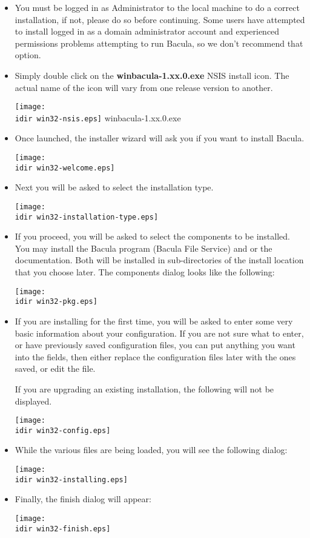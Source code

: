\begin{itemize}
\item You must be logged in as Administrator to the local machine
to do a correct installation, if not, please do so before continuing.
Some users have attempted to install logged in as a domain administrator
account and experienced permissions problems attempting to run
Bacula, so we don't recommend that option.
  
\item Simply double click on the {\bf winbacula-1.xx.0.exe}  NSIS install
   icon. The  actual name of the icon will vary from one release version to 
   another. 

\texttt{[image: \\idir win32-nsis.eps]}  winbacula-1.xx.0.exe  
  
\item Once launched, the installer wizard will ask you if you want  to install
   Bacula.  

\texttt{[image: \\idir win32-welcome.eps]}  

\item Next you will be asked to select the installation type. 

\texttt{[image: \\idir win32-installation-type.eps]}


\item If you proceed, you will be asked to select the components to be 
   installed. You may install the Bacula program (Bacula File Service)  and or
   the documentation. Both will be installed in sub-directories  of the install
   location that you choose later. The components  dialog looks like the
   following:  

\texttt{[image: \\idir win32-pkg.eps]}  

\item If you are installing for the first time, you will  be asked to
   enter some very basic information about your configuration. If
   you are not sure what to enter, or have previously saved configuration
   files, you can put anything you want into the fields, then either
   replace the configuration files later with the ones saved, or edit
   the file.

   If you are upgrading an existing installation, the following will
   not be displayed.


\texttt{[image: \\idir win32-config.eps]}  
 
\item While the various files are being loaded, you will see the following
   dialog:

   \texttt{[image: \\idir win32-installing.eps]}  


\item Finally, the finish dialog will appear:  

   \texttt{[image: \\idir win32-finish.eps]}  

\ 
\end{itemize}

